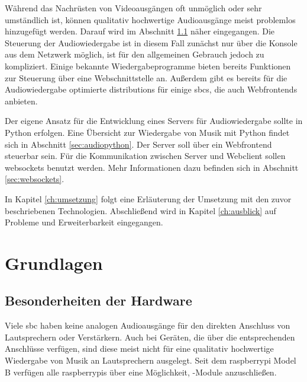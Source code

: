 \documentclass[12pt,a4paper,hidelinks]{scrreprt}
\begin{document}
    Während das Nachrüsten von Videoausgängen oft unmöglich oder sehr umständlich ist, können qualitativ hochwertige Audioausgänge meist problemlos hinzugefügt werden. Darauf wird im Abschnitt \ref{sec:technischeGrundlagen} näher eingegangen.
    Die Steuerung der Audiowiedergabe ist in diesem Fall zunächst nur über die Konsole aus dem Netzwerk möglich, ist für den allgemeinen Gebrauch jedoch zu kompliziert. Einige bekannte Wiedergabeprogramme bieten bereits Funktionen zur Steuerung über eine Webschnittstelle an. Außerdem gibt es bereits für die Audiowiedergabe optimierte \glspl{distribution} für einige \glspl{sbc}, die auch Webfrontends anbieten. 
    
    Der eigene Ansatz für die Entwicklung eines Servers für Audiowiedergabe sollte in Python erfolgen. Eine Übersicht zur Wiedergabe von Musik mit Python findet sich in Abschnitt \ref{sec:audiopython}. Der Server soll über ein Webfrontend steuerbar sein. Für die Kommunikation zwischen Server und Webclient sollen \glspl{websocket} benutzt werden. Mehr Informationen dazu befinden sich in Abschnitt \ref{sec:websockets}.
        
    In Kapitel \ref{ch:umsetzung} folgt eine Erläuterung der Umsetzung mit den zuvor beschriebenen Technologien.
    Abschließend wird in Kapitel \ref{ch:ausblick} auf Probleme und Erweiterbarkeit eingegangen. 

\chapter{Grundlagen}\label{ch:Grundlagen}

\section{Besonderheiten der Hardware}\label{sec:technischeGrundlagen}
	Viele \gls{sbc} haben keine analogen Audioausgänge für den direkten Anschluss von Lautsprechern oder Verstärkern. Auch bei Geräten, die über die entsprechenden Anschlüsse verfügen, sind diese meist nicht für eine qualitativ hochwertige Wiedergabe von Musik an Lautsprechern ausgelegt. 
	Seit dem \gls{raspberrypi} Model B verfügen alle \glspl{raspberrypi} über eine Möglichkeit, -Module anzuschließen. 
	
\end{document}
